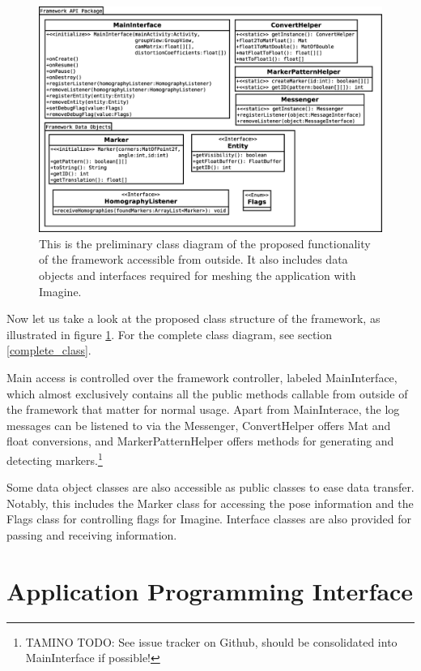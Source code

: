 \begin{figure}
	\centering
	\includegraphics[width=13cm]{img/class_diagram.eps}
	\caption[Public Class Diagram]{This is the preliminary class diagram of the proposed functionality of the framework accessible from outside. It also includes data objects and interfaces required for meshing the application with Imagine.}
	\label{fig:class_diagram}
\end{figure}

Now let us take a look at the proposed class structure of the framework, as illustrated in figure \ref{fig:class_diagram}.
For the complete class diagram, see section \ref{complete_class}.

Main access is controlled over the framework controller, labeled MainInterface, which almost exclusively contains all the public methods callable from outside of the framework that matter for normal usage.
Apart from MainInterace, the log messages can be listened to via the Messenger, ConvertHelper offers Mat and float conversions, and MarkerPatternHelper offers methods for generating and detecting markers.\footnote{TAMINO TODO: See issue tracker on Github, should be consolidated into MainInterface if possible!}

Some data object classes are also accessible as public classes to ease data transfer.
Notably, this includes the Marker class for accessing the pose information and the Flags class for controlling flags for Imagine.
Interface classes are also provided for passing and receiving information.

\section{Application Programming Interface}

